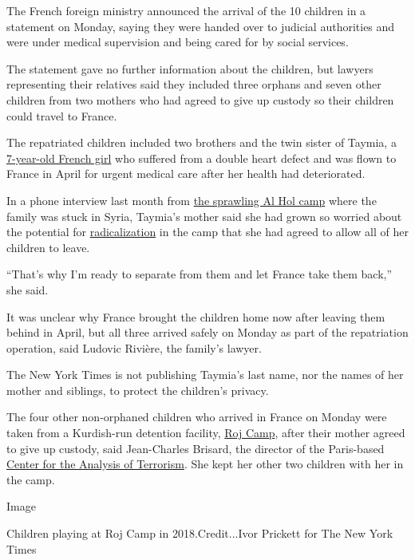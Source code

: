 The French foreign ministry announced the arrival of the 10 children in
a statement on Monday, saying they were handed over to judicial
authorities and were under medical supervision and being cared for by
social services.

The statement gave no further information about the children, but
lawyers representing their relatives said they included three orphans
and seven other children from two mothers who had agreed to give up
custody so their children could travel to France.

The repatriated children included two brothers and the twin sister of
Taymia, a
\href{https://www.nytimes.com/2020/05/31/world/middleeast/isis-children-syria-camps.html}{7-year-old
French girl} who suffered from a double heart defect and was flown to
France in April for urgent medical care after her health had
deteriorated.

In a phone interview last month from
\href{https://www.nytimes.com/2019/03/29/world/middleeast/isis-syria-women-children.html}{the
sprawling Al Hol camp} where the family was stuck in Syria, Taymia's
mother said she had grown so worried about the potential for
\href{https://www.nytimes.com/2019/09/03/world/middleeast/isis-alhol-camp-syria.html}{radicalization}
in the camp that she had agreed to allow all of her children to leave.

``That's why I'm ready to separate from them and let France take them
back,'' she said.

It was unclear why France brought the children home now after leaving
them behind in April, but all three arrived safely on Monday as part of
the repatriation operation, said Ludovic Rivière, the family's lawyer.

The New York Times is not publishing Taymia's last name, nor the names
of her mother and siblings, to protect the children's privacy.

The four other non-orphaned children who arrived in France on Monday
were taken from a Kurdish-run detention facility,
\href{https://www.nytimes.com/2018/07/04/world/middleeast/islamic-state-families-syria.html}{Roj
Camp}, after their mother agreed to give up custody, said Jean-Charles
Brisard, the director of the Paris-based
\href{http://cat-int.org/?lang=en}{Center for the Analysis of
Terrorism}. She kept her other two children with her in the camp.

Image

Children playing at Roj Camp in 2018.Credit...Ivor Prickett for The New
York Times

